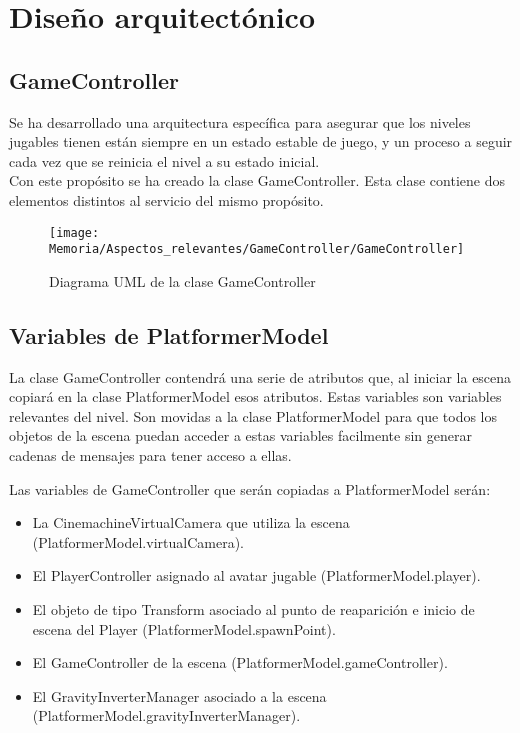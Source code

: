 \section{Diseño arquitectónico}
\subsection{GameController}
Se ha desarrollado una arquitectura específica para asegurar que los niveles jugables tienen están siempre en un estado estable de juego, y un proceso a seguir cada vez que se reinicia el nivel a su estado inicial.\\
Con este propósito se ha creado la clase GameController. Esta clase contiene dos elementos distintos al servicio del mismo propósito.

\begin{figure}[h]
\centering
\texttt{[image: Memoria/Aspectos\_relevantes/GameController/GameController]}
\caption{Diagrama UML de la clase GameController}
\end{figure}

\subsection{Variables de PlatformerModel}
La clase GameController contendrá una serie de atributos que, al iniciar la escena copiará en la clase PlatformerModel esos atributos. Estas variables son variables relevantes del nivel. Son movidas a la clase PlatformerModel para que todos los objetos de la escena puedan acceder a estas variables facilmente sin generar cadenas de mensajes para tener acceso a ellas.

Las variables de GameController que serán copiadas a PlatformerModel serán:
\begin{itemize}
\item
La CinemachineVirtualCamera que utiliza la escena (PlatformerModel.virtualCamera).
\item
El PlayerController asignado al avatar jugable (PlatformerModel.player).
\item
El objeto de tipo Transform asociado al punto de reaparición e inicio de escena del Player (PlatformerModel.spawnPoint).
\item
El GameController de la escena (PlatformerModel.gameController).
\item
El GravityInverterManager asociado a la escena \\ (PlatformerModel.gravityInverterManager).
\end{itemize}

